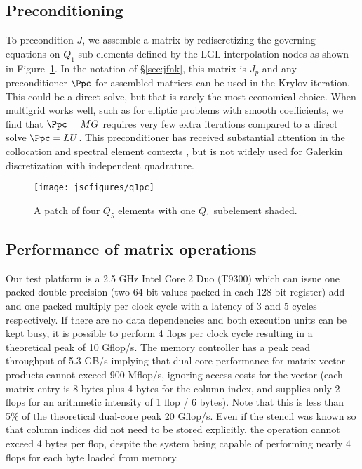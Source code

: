 \subsection{Preconditioning}\label{sec:preconditioning}
To precondition $J$, we assemble a matrix by rediscretizing the governing equations on $Q_1$ sub-elements defined by the
LGL interpolation nodes as shown in Figure~\ref{fig:q1pc}.  In the notation of \S\ref{sec:jfnk}, this matrix is $J_p$
and any preconditioner $\Ppc$ for assembled matrices can be used in the Krylov iteration.  This could be a direct solve,
but that is rarely the most economical choice.  When multigrid works well, such as for elliptic problems with smooth
coefficients, we find that $\Ppc = MG$ requires very few extra iterations compared to a direct solve $\Ppc = LU$.  This
preconditioner has received substantial attention in the collocation and spectral element contexts
\citep[\eg][]{orszag1980smp,deville1985cps,deville1990fep,heys2005amh,kim2007pbp}, but is not widely used for Galerkin
discretization with independent quadrature.

\begin{figure}
  \centering\texttt{[image: jscfigures/q1pc]}
  \caption{A patch of four $Q_5$ elements with one $Q_1$ subelement shaded.}\label{fig:q1pc}
\end{figure}

\subsection{Performance of matrix operations}\label{sec:mat-perf}
Our test platform is a 2.5 GHz Intel Core 2 Duo (T9300) which can issue one packed double precision (two 64-bit values
packed in each 128-bit register) add and one packed multiply per clock cycle with a latency of 3 and 5 cycles
respectively.  If there are no data dependencies and both execution units can be kept busy, it is possible to perform 4
flops per clock cycle resulting in a theoretical peak of 10 Gflop/s.  The memory controller has a peak read throughput
of 5.3 GB/s implying that dual core performance for matrix-vector products cannot exceed 900 Mflop/s, ignoring access
costs for the vector (each matrix entry is 8 bytes plus 4 bytes for the column index, and supplies only 2 flops for an
arithmetic intensity of 1 flop / 6 bytes).  Note that this is less than 5\% of the theoretical dual-core peak 20
Gflop/s.  Even if the stencil was known so that column indices did not need to be stored explicitly, the operation cannot exceed 4 bytes per flop, despite the system being
capable of performing nearly 4 flops for each byte loaded from memory.

